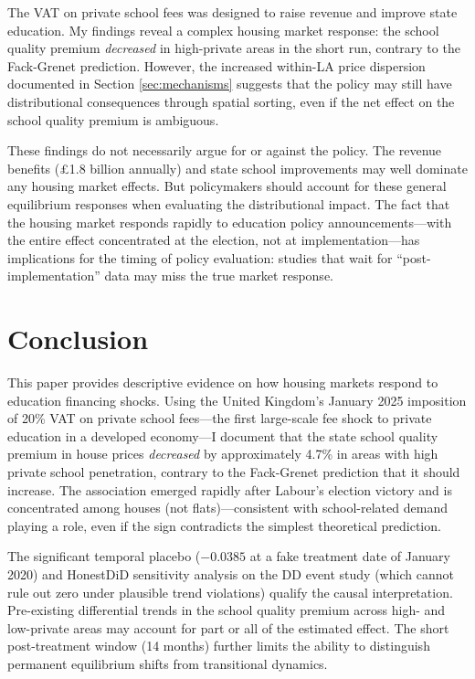 \documentclass[12pt]{article}
\begin{document}
The VAT on private school fees was designed to raise revenue and improve state education. My findings reveal a complex housing market response: the school quality premium \textit{decreased} in high-private areas in the short run, contrary to the Fack-Grenet prediction. However, the increased within-LA price dispersion documented in Section \ref{sec:mechanisms} suggests that the policy may still have distributional consequences through spatial sorting, even if the net effect on the school quality premium is ambiguous.

These findings do not necessarily argue for or against the policy. The revenue benefits (\pounds 1.8 billion annually) and state school improvements may well dominate any housing market effects. But policymakers should account for these general equilibrium responses when evaluating the distributional impact. The fact that the housing market responds rapidly to education policy announcements---with the entire effect concentrated at the election, not at implementation---has implications for the timing of policy evaluation: studies that wait for ``post-implementation'' data may miss the true market response.


\section{Conclusion}\label{sec:conclusion}

This paper provides descriptive evidence on how housing markets respond to education financing shocks. Using the United Kingdom's January 2025 imposition of 20\% VAT on private school fees---the first large-scale fee shock to private education in a developed economy---I document that the state school quality premium in house prices \textit{decreased} by approximately 4.7\% in areas with high private school penetration, contrary to the Fack-Grenet prediction that it should increase. The association emerged rapidly after Labour's election victory and is concentrated among houses (not flats)---consistent with school-related demand playing a role, even if the sign contradicts the simplest theoretical prediction.

The significant temporal placebo ($-0.0385$ at a fake treatment date of January 2020) and HonestDiD sensitivity analysis on the DD event study (which cannot rule out zero under plausible trend violations) qualify the causal interpretation. Pre-existing differential trends in the school quality premium across high- and low-private areas may account for part or all of the estimated effect. The short post-treatment window (14 months) further limits the ability to distinguish permanent equilibrium shifts from transitional dynamics.
\end{document}
